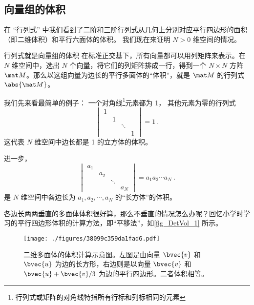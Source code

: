 

\subsection{向量组的体积}

在 “行列式” 中我们看到了二阶和三阶行列式从几何上分别对应平行四边形的面积（即二维体积）和平行六面体的体积。 我们现在来证明 $N > 0$ 维空间的情况。

\begin{theorem}{行列式就是向量组的体积}
在标准正交基下，所有向量都可以用列矩阵来表示。在 $N$ 维空间中，选出 $N$ 个向量，将它们的列矩阵排成一行，得到一个 $N\times N$ 方阵 $\mat M$。那么以这组向量为边长的平行多面体的“体积”，就是 $\mat M$ 的行列式 $\abs{\mat M}$。
\end{theorem}


我们先来看最简单的例子： 一个对角线\footnote{行列式或矩阵的对角线特指所有行标和列标相同的元素}元素都为 1， 其他元素为零的行列式
\begin{equation}
\begin{vmatrix}
1 & & &\\
  & 1 & &\\
  &  & \ddots &\\
  & & & 1
\end{vmatrix} = 1~.
\end{equation}
这代表 $N$ 维空间中边长都是 1 的立方体的体积。

进一步，
\begin{equation}
\begin{vmatrix}
a_1 & & &\\
  & a_2 & &\\
  &  & \ddots &\\
  & & & a_N
\end{vmatrix} = a_1a_2\cdots a_N~.
\end{equation}
是 $N$ 维空间中各边长为 $a_1, a_2, \cdots, a_N$ 的“长方体”的体积。

各边长两两垂直的多面体体积很好算，那么不垂直的情况怎么办呢？回忆小学时学习的平行四边形体积的计算方法，即“平移法”，如\autoref{fig_DetVol_1} 所示。
\begin{figure}[ht]
\centering
\texttt{[image: ./figures/38099c359da1fad6.pdf]}
\caption{二维多面体的体积计算示意图。左图是由向量 $\bvec{v}$ 和 $\bvec{u}$ 为边的长方形，右边则是以向量 $\bvec{v}$ 和 $\bvec{u}+\bvec{v}/3$ 为边的平行四边形。二者体积相等。} \label{fig_DetVol_1}
\end{figure}

